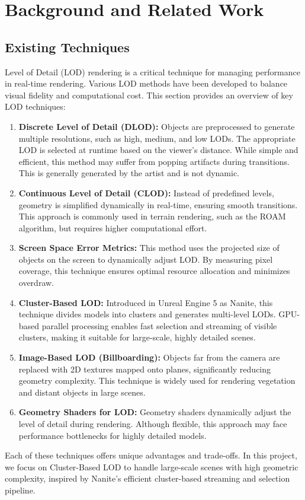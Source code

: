 \documentclass[12pt]{extarticle}
\begin{document}
\section{Background and Related Work}
\subsection{Existing Techniques}
Level of Detail (LOD) rendering is a critical technique for managing performance in real-time rendering. Various LOD methods have been 
developed to balance visual fidelity and computational cost. This section provides an overview of key LOD techniques:
\begin{enumerate}
    \item \textbf{Discrete Level of Detail (DLOD):} Objects are preprocessed to generate multiple resolutions, such as high, medium, 
    and low LODs. The appropriate LOD is selected at runtime based on the viewer's distance. While simple and efficient, this method 
    may suffer from popping artifacts during transitions. This is generally generated by the artist and is not dynamic.

    \item \textbf{Continuous Level of Detail (CLOD):} Instead of predefined levels, geometry is simplified dynamically in real-time, 
    ensuring smooth transitions. This approach is commonly used in terrain rendering, such as the ROAM algorithm, but requires higher 
    computational effort.

    \item \textbf{Screen Space Error Metrics:} This method uses the projected size of objects on the screen to dynamically adjust LOD. 
    By measuring pixel coverage, this technique ensures optimal resource allocation and minimizes overdraw.

    \item \textbf{Cluster-Based LOD:} Introduced in Unreal Engine 5 as Nanite, this technique divides models into clusters and generates 
    multi-level LODs. GPU-based parallel processing enables fast selection and streaming of visible clusters, making it suitable for 
    large-scale, highly detailed scenes.

    \item \textbf{Image-Based LOD (Billboarding):} Objects far from the camera are replaced with 2D textures mapped onto planes, 
    significantly reducing geometry complexity. This technique is widely used for rendering vegetation and distant objects in large scenes.

    \item \textbf{Geometry Shaders for LOD:} Geometry shaders dynamically adjust the level of detail during rendering. Although 
    flexible, this approach may face performance bottlenecks for highly detailed models.
\end{enumerate}
Each of these techniques offers unique advantages and trade-offs. In this project, we focus on Cluster-Based LOD to handle large-scale 
scenes with high geometric complexity, inspired by Nanite's efficient cluster-based streaming and selection pipeline.
\end{document}
